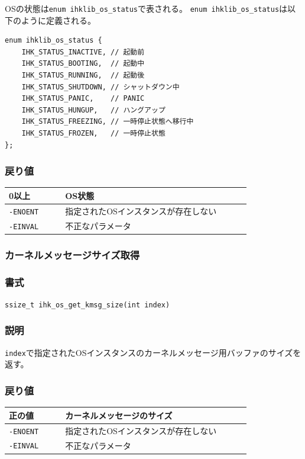 \documentclass[twoside,11pt,fleqn]{book}
\begin{document}
OSの状態は\texttt{enum ihklib\_os\_status}で表される。
\texttt{enum ihklib\_os\_status}は以下のように定義される。
\small
\begin{verbatim}
enum ihklib_os_status {
    IHK_STATUS_INACTIVE, // 起動前
    IHK_STATUS_BOOTING,  // 起動中
    IHK_STATUS_RUNNING,  // 起動後
    IHK_STATUS_SHUTDOWN, // シャットダウン中
    IHK_STATUS_PANIC,    // PANIC
    IHK_STATUS_HUNGUP,   // ハングアップ
    IHK_STATUS_FREEZING, // 一時停止状態へ移行中
    IHK_STATUS_FROZEN,   // 一時停止状態
};
\end{verbatim}
\normalsize

\subsubsection*{戻り値}
\begin{table}[!h]
\footnotesize
\begin{tabular}{|p{0.20\linewidth}|p{0.66\linewidth}|} \hline
0以上&OS状態\\ \hline
\texttt{-ENOENT}&指定されたOSインスタンスが存在しない\\ \hline
\texttt{-EINVAL}&不正なパラメータ\\ \hline
\end{tabular}
\vspace{-0em}
\end{table}
\FloatBarrier

\subsubsection{カーネルメッセージサイズ取得}
\subsubsection*{書式}{\quad} \texttt{ssize\_t ihk\_os\_get\_kmsg\_size(int index)}
\subsubsection*{説明}{\quad} \texttt{index}で指定されたOSインスタンスのカーネルメッセージ用バッファのサイズを返す。

\subsubsection*{戻り値}
\begin{table}[!h]
\footnotesize
\begin{tabular}{|p{0.20\linewidth}|p{0.66\linewidth}|} \hline
正の値&カーネルメッセージのサイズ\\ \hline
\texttt{-ENOENT}&指定されたOSインスタンスが存在しない\\ \hline
\texttt{-EINVAL}&不正なパラメータ\\ \hline
\end{tabular}
\vspace{-0em}
\end{table}
\FloatBarrier
\end{document}
